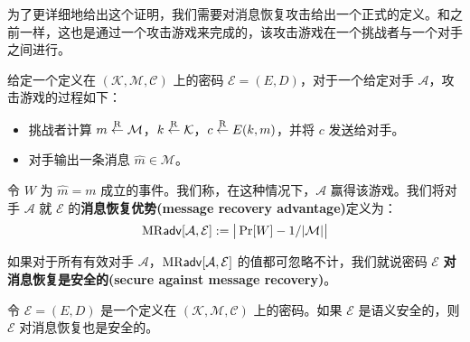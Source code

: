 为了更详细地给出这个证明，我们需要对消息恢复攻击给出一个正式的定义。和之前一样，这也是通过一个攻击游戏来完成的，该攻击游戏在一个挑战者与一个对手之间进行。

\begin{game}[消息恢复]\label{game:2-2}
给定一个定义在 $(\mathcal{K},\mathcal{M},\mathcal{C})$ 上的密码 $\mathcal{E}=(E,D)$，对于一个给定对手 $\mathcal{A}$，攻击游戏的过程如下：
\begin{itemize}
	\item 挑战者计算 $m\overset{\rm R}\leftarrow\mathcal{M}$，$k\overset{\rm R}\leftarrow\mathcal{K}$，$c\overset{\rm R}\leftarrow E(k,m)$，并将 $c$ 发送给对手。
	\item 对手输出一条消息 $\hat m\in\mathcal{M}$。
\end{itemize}
令 $W$ 为 $\hat m=m$ 成立的事件。我们称，在这种情况下，$\mathcal{A}$ 赢得该游戏。我们将对手 $\mathcal{A}$ 就 $\mathcal{E}$ 的\textbf{消息恢复优势(message recovery advantage)}定义为：
\[
{\rm MR\mathsf{adv}}[\mathcal{A},\mathcal{E}]:=
\big\lvert
\Pr[W] -1/|\mathcal{M}|
\big\rvert
\]
\end{game}

\begin{definition}[针对消息恢复的安全性]
如果对于所有有效对手 $\mathcal{A}$，${\rm MR\mathsf{adv}}[\mathcal{A},\mathcal{E}]$ 的值都可忽略不计，我们就说密码 $\mathcal{E}$ \textbf{对消息恢复是安全的(secure against message recovery)}。
\end{definition}

\begin{theorem}\label{theo:2-7}
令 $\mathcal{E}=(E,D)$ 是一个定义在 $(\mathcal{K},\mathcal{M},\mathcal{C})$ 上的密码。如果 $\mathcal{E}$ 是语义安全的，则 $\mathcal{E}$ 对消息恢复也是安全的。
\end{theorem}

